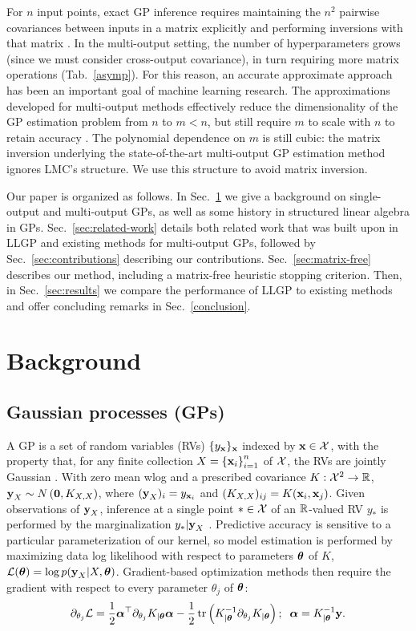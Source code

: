 \documentclass{article}
\begin{document}
For $n$ input points, exact GP inference requires maintaining the $n^2$ pairwise covariances between inputs in a matrix explicitly and performing inversions with that matrix \cite{williams1996gaussian}. In the multi-output setting, the number of hyperparameters grows (since we must consider cross-output covariance), in turn requiring more matrix operations (Tab.~\ref{asymp}). For this reason, an accurate approximate approach has been an important goal of machine learning research. The approximations developed for multi-output methods effectively reduce the dimensionality of the GP estimation problem from $n$ to $m<n$, but still require $m$ to scale with $n$ to retain accuracy \cite{nguyen2014collaborative}. The polynomial dependence on $m$ is still cubic: the matrix inversion underlying the state-of-the-art multi-output GP estimation method ignores LMC's structure. We use this structure to avoid matrix inversion.


Our paper is organized as follows. In Sec.~\ref{sec:background} we give a background on single-output and multi-output GPs, as well as some history in structured linear algebra in GPs. Sec.~\ref{sec:related-work} details both related work that was built upon in LLGP and existing methods for multi-output GPs, followed by Sec.~\ref{sec:contributions} describing our contributions. Sec.~\ref{sec:matrix-free} describes our method, including a matrix-free heuristic stopping criterion. Then, in Sec.~\ref{sec:results} we compare the performance of LLGP to existing methods and offer concluding remarks in Sec.~\ref{conclusion}.


\section{Background}
\label{sec:background}

\subsection{Gaussian processes (GPs)}

A GP is a set of random variables (RVs) $\{y_{\textbf{x}}\}_{\textbf{x}}$ indexed by $\textbf{x}\in\mathcal{X}$, with the property that, for any finite collection $X=\left\{ \textbf{x}_i \right\}_{ i=1 }^{ n }$ of $\mathcal{X}$, the RVs are jointly Gaussian \cite{williams1996gaussian}. With zero mean wlog and a prescribed covariance $K:\mathcal{X}^2\rightarrow\mathbb{R}$, $\textbf{y}_X\sim N\left({\textbf{0}, K_{X, X}}\right)$, where $(\textbf{y}_X)_i=y_{\textbf{x}_i}$ and $(K_{X,X})_{ij}=K(\textbf{x}_i,\textbf{x}_j)$. Given observations of $\textbf{y}_X$, inference at a single point $*\in\mathcal{X}$ of an $\mathbb{R}$-valued RV $y_*$ is performed by the marginalization $y_*|\textbf{y}_X$ \cite{williams1996gaussian}.
Predictive accuracy is sensitive to a particular parameterization of our kernel, so model estimation is performed by maximizing data log likelihood with respect to parameters ${\boldsymbol\theta}$ of $K$, $\mathcal{L}({\boldsymbol\theta})=\log p(\textbf{y}_{X}|X,{\boldsymbol\theta})$. Gradient-based optimization methods then require the gradient with respect to every parameter $\theta_j$ of ${\boldsymbol\theta}$:
\begin{align}
\partial_{\theta_j}\mathcal{L} = \frac{1}{2}{\boldsymbol\alpha}^\top\partial_{\theta_j}K_{|{\boldsymbol\theta}}{\boldsymbol\alpha} -\frac{1}{2}\operatorname{tr}\left({K_{|{\boldsymbol\theta}}^{-1}\partial_{\theta_j}K_{|{\boldsymbol\theta}}}\right);\;\; {\boldsymbol\alpha}=K_{|{\boldsymbol\theta}}^{-1}\textbf{y}.\label{llgradient}
\end{align}
\end{document}
